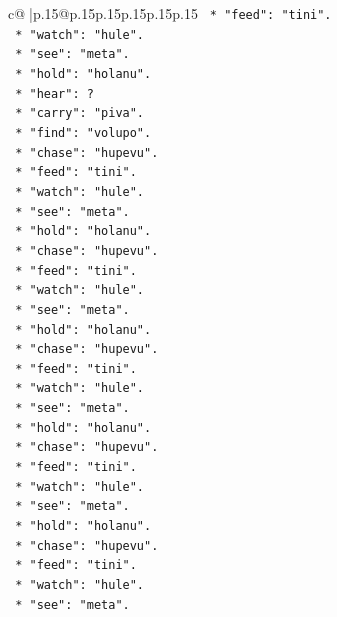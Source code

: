 \documentclass{article}
\begin{document}
{\begin{supertabular}{c@{$\;$}|p{.15\linewidth}@{}p{.15\linewidth}p{.15\linewidth}p{.15\linewidth}p{.15\linewidth}p{.15\linewidth}}
{{{\texttt{            *   "feed": "tini".} \\
\texttt{            *   "watch": "hule".} \\
\texttt{            *   "see": "meta".} \\
\texttt{            *   "hold": "holanu".} \\
\texttt{            *   "hear": ?} \\
\texttt{            *   "carry": "piva".} \\
\texttt{            *   "find": "volupo".} \\
\texttt{            *   "chase": "hupevu".} \\
\texttt{            *   "feed": "tini".} \\
\texttt{            *   "watch": "hule".} \\
\texttt{            *   "see": "meta".} \\
\texttt{            *   "hold": "holanu".} \\
\texttt{            *   "chase": "hupevu".} \\
\texttt{            *   "feed": "tini".} \\
\texttt{            *   "watch": "hule".} \\
\texttt{            *   "see": "meta".} \\
\texttt{            *   "hold": "holanu".} \\
\texttt{            *   "chase": "hupevu".} \\
\texttt{            *   "feed": "tini".} \\
\texttt{            *   "watch": "hule".} \\
\texttt{            *   "see": "meta".} \\
\texttt{            *   "hold": "holanu".} \\
\texttt{            *   "chase": "hupevu".} \\
\texttt{            *   "feed": "tini".} \\
\texttt{            *   "watch": "hule".} \\
\texttt{            *   "see": "meta".} \\
\texttt{            *   "hold": "holanu".} \\
\texttt{            *   "chase": "hupevu".} \\
\texttt{            *   "feed": "tini".} \\
\texttt{            *   "watch": "hule".} \\
\texttt{            *   "see": "meta".} \\
}}}
\end{supertabular}}
\end{document}
